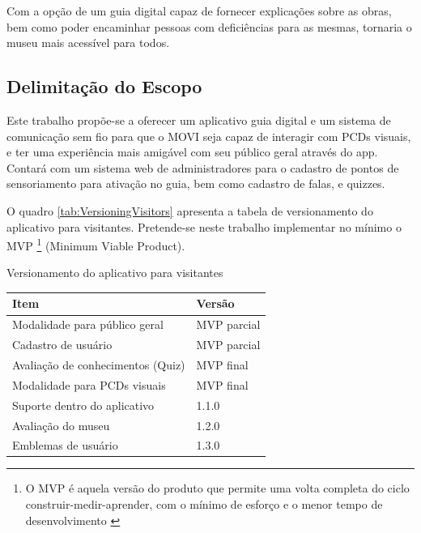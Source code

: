 Com a opção de um guia digital capaz de fornecer explicações sobre as obras, bem como poder encaminhar pessoas com deficiências para as mesmas, tornaria o museu mais acessível para todos.

\subsection{Delimitação do Escopo}

Este trabalho propõe-se a oferecer um aplicativo guia digital e um sistema de comunicação sem fio para que o MOVI seja capaz de interagir com PCDs visuais, e ter uma experiência mais amigável com seu público geral através do app. Contará com um sistema web de administradores para o cadastro de pontos de sensoriamento para ativação no guia, bem como cadastro de falas, e quizzes.

O quadro \ref{tab:VersioningVisitors} apresenta a tabela de versionamento do aplicativo para visitantes. Pretende-se neste trabalho implementar no mínimo o MVP \footnote{O MVP é aquela versão do produto que permite uma volta completa do ciclo construir-medir-aprender, com o mínimo de esforço e o menor tempo de desenvolvimento \cite{TheLeanStartup}} (Minimum Viable Product).

\renewcommand{\arraystretch}{1}
\begin{quadro}[H]
    \centering
    \caption{Versionamento do aplicativo para visitantes}
    \begin{tabular}{|m{}|m{}|}
        \hline
        \rowcolor[HTML]{C0C0C0}
        \textbf{Item} & \textbf{Versão} \\
        \hline
        Modalidade para público geral & MVP parcial \\
        \hline
        Cadastro de usuário & MVP parcial \\
        \hline
        Avaliação de conhecimentos (Quiz) & MVP final \\
        \hline
        Modalidade para PCDs visuais & MVP final \\
        \hline
        Suporte dentro do aplicativo & 1.1.0 \\
        \hline
        Avaliação do museu & 1.2.0 \\
        \hline
        Emblemas de usuário & 1.3.0 \\
        \hline
    \end{tabular}
    \vspace{-0.6cm}
    \label{tab:VersioningVisitors}
\end{quadro}
\renewcommand{\arraystretch}{1.1}

